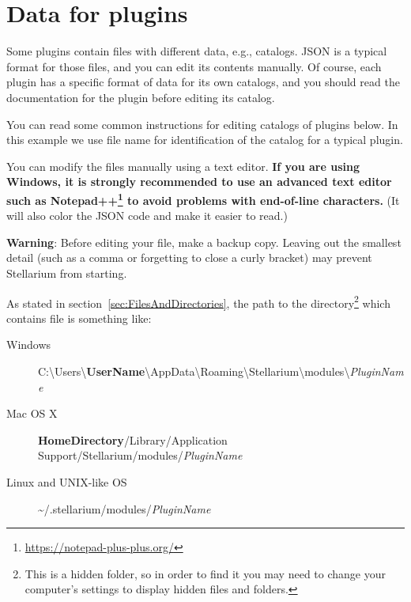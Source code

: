 \section{Data for plugins}
\label{sec:Plugins:DataForPlugins}

Some plugins contain files with different data, e.g., catalogs. JSON is a
typical format for those files, and you can edit its contents manually. Of
course, each plugin has a specific format of data for its own catalogs, and
you should read the documentation for the plugin before editing its catalog.

You can read some common instructions for editing catalogs of plugins
below. In this example we use file name  for
identification of the catalog for a typical plugin.

You can modify the  files manually using a text
editor. \textbf{If you are using Windows, it is strongly recommended to
use an advanced text editor such as
Notepad++\footnote{\url{https://notepad-plus-plus.org/}} to avoid problems with
end-of-line characters.} (It will also color the JSON code and make it
easier to read.)

\textbf{Warning}: Before editing your  file, make a
backup copy. Leaving out the smallest detail (such as a comma or
forgetting to close a curly bracket) may prevent Stellarium from
starting.

As stated in section~\ref{sec:FilesAndDirectories}, the path to the
directory\footnote{This is a hidden folder, so in order to find it you
  may need to change your computer's settings to display hidden files
  and folders.} which contains  file is something
like:

\begin{description}
\item[Windows]
  C:\textbackslash Users\textbackslash\textbf{UserName}\textbackslash AppData\textbackslash Roaming\textbackslash Stellarium\textbackslash modules\textbackslash \textit{PluginName}
\item[Mac OS X]
  \textbf{HomeDirectory}/Library/Application Support/Stellarium/modules/\textit{PluginName}
\item[Linux and UNIX-like OS]
  \textasciitilde{}/.stellarium/modules/\textit{PluginName}
\end{description}



